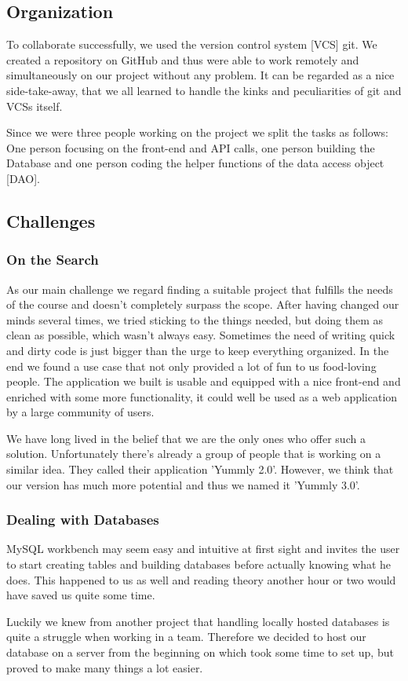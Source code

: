\documentclass[11pt,a4paper,notitlepage]{article}
\begin{document}
\subsection*{Organization}
To collaborate successfully, we used the version control system [VCS] git. We created a repository on GitHub and thus were able to work remotely and simultaneously on our project without any problem. It can be regarded as a nice side-take-away, that we all learned to handle the kinks and peculiarities of git and VCSs itself. \par Since we were three people working on the project we split the tasks as follows: One person focusing on the front-end and API calls, one person building the Database and one person coding the helper functions of the data access object [DAO].

\subsection*{Challenges}
\subsubsection*{On the Search}
As our main challenge we regard finding a suitable project that fulfills the needs of the course and doesn't completely surpass the scope. After having changed our minds several times, we tried sticking to the things needed, but doing them as clean as possible, which wasn't always easy. Sometimes the need of writing quick and dirty code is just bigger than the urge to keep everything organized. In the end we found a use case that not only provided a lot of fun to us food-loving people. The application we built is usable and equipped with a nice front-end and enriched with some more functionality, it could well be used as a web application by a large community of users. \par We have long lived in the belief that we are the only ones who offer such a solution. Unfortunately there's already a group of people that is working on a similar idea. They called their application 'Yummly 2.0'. However, we think that our version has much more potential and thus we named it 'Yummly 3.0'.
\subsubsection*{Dealing with Databases}
MySQL workbench may seem easy and intuitive at first sight and invites the user to start creating tables and building databases before actually knowing what he does. This happened to us as well and reading theory another hour or two would have saved us quite some time. \par Luckily we knew from another project that handling locally hosted databases is quite a struggle when working in a team. Therefore we decided to host our database on a server from the beginning on which took some time to set up, but proved to make many things a lot easier.\par
\end{document}

